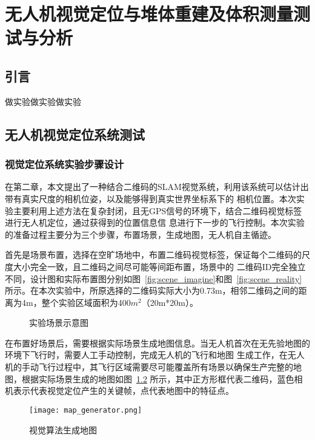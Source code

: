 \chapter{无人机视觉定位与堆体重建及体积测量测试与分析}
\label{cha:chap5}
\section{引言}
\label{sec:5.1}
做实验做实验做实验
\section{无人机视觉定位系统测试}
\label{sec:5.2}
\subsection{视觉定位系统实验步骤设计}
\label{sec:5.2.1}
在第二章，本文提出了一种结合二维码的SLAM视觉系统，利用该系统可以估计出带有真实尺度的相机位姿，以及能够得到真实世界坐标系下的
相机位置。本次实验主要利用上述方法在复杂封闭，且无GPS信号的环境下，结合二维码视觉标签进行无人机定位，通过获得到的位置信息信
息进行下一步的飞行控制。本次实验的准备过程主要分为三个步骤，布置场景，生成地图，无人机自主循迹。

首先是场景布置，选择在空旷场地中，布置二维码视觉标签，保证每个二维码的尺度大小完全一致，且二维码之间尽可能等间距布置，场景中的
二维码ID完全独立不同，设计图和实际布置图分别如图~\ref{fig:scene_imagine}和图~\ref{fig:scene_reality}所示。在本次实验中，所原选择的二维码实际大小为0.73m，相邻二维码之间的距
离为4m，整个实验区域面积为400$m^2$（20m*20m）。
\begin{figure}[H]
  \centering%
  \hspace{4em}%
  \caption{实验场景示意图}
  \label{fig:scene}
\end{figure}

在布置好场景后，需要根据实际场景生成地图信息。当无人机首次在无先验地图的环境下飞行时，需要人工手动控制，完成无人机的飞行和地图
生成工作，在无人机的手动飞行过程中，其飞行区域需要尽可能覆盖所有场景以确保生产完整的地图，根据实际场景生成的地图如图~\ref{fig:map_generator}
所示，其中正方形框代表二维码，蓝色相机表示代表视觉定位产生的关键帧，点代表地图中的特征点。

\begin{figure}[H] %
  \centering
  \texttt{[image: map\_generator.png]}
  \caption{视觉算法生成地图}
  \label{fig:map_generator}
\end{figure}

